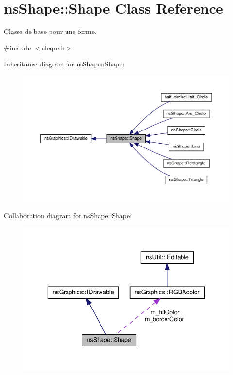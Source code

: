 \hypertarget{classns_shape_1_1_shape}{}\section{ns\+Shape\+:\+:Shape Class Reference}
\label{classns_shape_1_1_shape}


Classe de base pour une forme.  




{\ttfamily \#include $<$shape.\+h$>$}



Inheritance diagram for ns\+Shape\+:\+:Shape\+:
\nopagebreak
\begin{figure}[H]
\begin{center}
\leavevmode
\includegraphics[width=350pt]{classns_shape_1_1_shape__inherit__graph}
\end{center}
\end{figure}


Collaboration diagram for ns\+Shape\+:\+:Shape\+:
\nopagebreak
\begin{figure}[H]
\begin{center}
\leavevmode
\includegraphics[width=336pt]{classns_shape_1_1_shape__coll__graph}
\end{center}
\end{figure}
